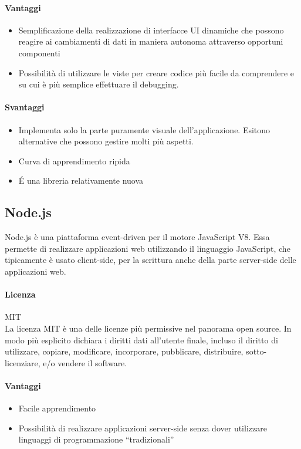 \paragraph{Vantaggi}
\begin{itemize}
	\item Semplificazione della realizzazione di interfacce UI dinamiche che possono reagire ai cambiamenti di dati in maniera autonoma attraverso opportuni componenti
	\item Possibilità di utilizzare le viste per creare codice più facile da comprendere e su cui è più semplice effettuare il debugging.
	
\end{itemize}

\paragraph{Svantaggi} 
\begin{itemize}
	\item Implementa solo la parte puramente visuale
     dell'applicazione. Esitono alternative che possono gestire molti
     più aspetti.
	\item Curva di apprendimento ripida
	\item \'E una libreria relativamente nuova
\end{itemize}

\subsection{Node.js}

Node.js è una piattaforma event-driven per il motore JavaScript
V8. Essa permette di realizzare applicazioni web utilizzando il
linguaggio JavaScript, che tipicamente è usato client-side, per la scrittura anche
della parte server-side delle applicazioni web. 
\\
\paragraph{Licenza} MIT \\
La licenza MIT è una delle licenze più permissive nel panorama open
source. In modo più esplicito dichiara i diritti dati all'utente
finale, incluso il diritto di utilizzare, copiare, modificare,
incorporare, pubblicare, distribuire, sotto-licenziare, e/o vendere il
software. \\

\paragraph{Vantaggi}
\begin{itemize}
	\item Facile apprendimento
	\item Possibilità di realizzare applicazioni server-side senza
     dover utilizzare linguaggi di programmazione “tradizionali”
\end{itemize}

